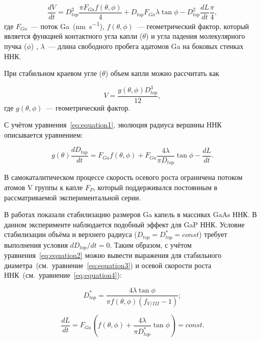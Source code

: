 \begin{equation} \label{eq:equation1} \frac{dV}{dt}=D_{top}^2 \frac{\pi F_{Ga}
	f(\theta,\phi)}{4}+ D_{top} F_{Ga} \lambda \tan{\phi} - D_{top}^2 \frac{dL}{dt}
	\frac{\pi}{4},
\end{equation}
где \(F_{Ga}\)~--- поток Ga~(\si{\nano\meter\per\second}),
\(f(\theta,\phi)\)~--- геометрический фактор, который является функцией
контактного угла капли (\(\theta\)) и угла падения молекулярного пучка
(\(\phi\)) \cite{glas2010vapor}, \(\lambda\)~--- длина свободного пробега
адатомов Ga на боковых стенках ННК.

При стабильном краевом угле (\(\theta\)) объем капли можно рассчитать как

\begin{equation}
	\label{eq:equation7} V=\frac{g(\theta,\phi)D_{top}^3}{12},
\end{equation}
где \(g(\theta,\phi)\)~--- геометрический фактор.

С учётом уравнения~\ref{eq:equation1}, эволюция радиуса вершины ННК описывается
уравнением:

\begin{equation} \label{eq:equation2} g(\theta) \frac{dD_{top}}{dt}=F_{Ga}
	f(\theta,\phi)+ F_{Ga} \frac{4 \lambda}{\pi D_{top}} \tan{\phi}-\frac{dL}{dt}.
\end{equation}

В самокаталитическом процессе скорость осевого роста ограничена потоком атомов
V группы к капле \(F_P\), который поддерживался постоянным в рассматриваемой
экспериментальной серии.

В работах
\cite{tersoff2015stable,dubrovskii2016regimes,berdnikov2020comparison} показали
стабилизацию размеров Ga капель в массивах GaAs ННК. В данном эксперименте наблюдается подобный эффект для GaP
ННК. Условие стабилизации объёма и верхнего
радиуса (\(D_{top} = D_{top}^\ast = const\)) требует выполнения условия
\(dD_{top} / dt = 0\). Таким образом, с учётом уравнения~\ref{eq:equation2}
можно вывести выражения для стабильного
диаметра~(см.~уравнение~\ref{eq:equation3}) и осевой скорости роста
ННК~(см.~уравнение~\ref{eq:equation4}):

\begin{equation} \label{eq:equation3} D_{top}^\ast=\frac{4 \lambda
\tan{\phi}}{\pi f(\theta,\phi)(f_{V/III}-1)}; \end{equation}

\begin{equation} \label{eq:equation4} \frac{dL}{dt}=F_{Ga} \left(
	f(\theta,\phi) + \frac{4 \lambda}{\pi D_{top}^\ast}\tan{\phi} \right)=const.
\end{equation}


